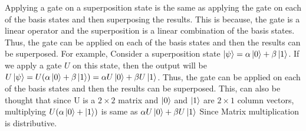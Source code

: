 \begin{importantnote}
    Applying a gate on a superposition state is the same as applying the gate on each of the basis states and then superposing the results.
    This is because, the gate is a linear operator and the superposition is a linear combination of the basis states. 
    Thus, the gate can be applied on each of the basis states and then the results can be superposed. For example, Consider a superposition state $\ket{\psi}=\alpha\ket{0}+\beta\ket{1}$.
    If we apply a gate $U$ on this state, then the output will be $U\ket{\psi}=U(\alpha\ket{0}+\beta\ket{1})=\alpha U\ket{0}+\beta U\ket{1}$.
    Thus, the gate can be applied on each of the basis states and then the results can be superposed. This, can also be thought that since U is a $2 \times 2$ matrix and $\ket{0}$ and $\ket{1}$ are $2 \times 1$ column vectors, 
    multiplying $U(\alpha\ket{0}+\ket{1})$ is same as $\alpha U\ket{0}+\beta U\ket{1}$ Since Matrix multiplication is distributive. 


\end{importantnote}
